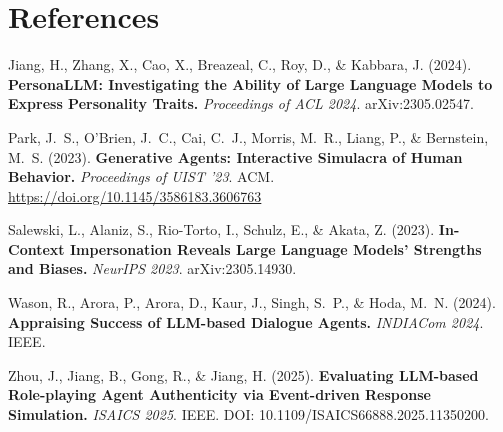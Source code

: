\documentclass[12pt,a4paper]{article}
\begin{document}
\section{References}

\begin{description}[leftmargin=0em,itemsep=0.5em]
  \item Jiang, H., Zhang, X., Cao, X., Breazeal, C., Roy, D., \& Kabbara, J. (2024).
        \textbf{PersonaLLM: Investigating the Ability of Large Language Models to Express
        Personality Traits.} \textit{Proceedings of ACL 2024}. arXiv:2305.02547.
  \item Park, J.\ S., O'Brien, J.\ C., Cai, C.\ J., Morris, M.\ R., Liang, P., \&
        Bernstein, M.\ S. (2023). \textbf{Generative Agents: Interactive Simulacra of
        Human Behavior.} \textit{Proceedings of UIST '23}. ACM.
        \url{https://doi.org/10.1145/3586183.3606763}
  \item Salewski, L., Alaniz, S., Rio-Torto, I., Schulz, E., \& Akata, Z. (2023).
        \textbf{In-Context Impersonation Reveals Large Language Models' Strengths and
        Biases.} \textit{NeurIPS 2023}. arXiv:2305.14930.
  \item Wason, R., Arora, P., Arora, D., Kaur, J., Singh, S.\ P., \& Hoda, M.\ N. (2024).
        \textbf{Appraising Success of LLM-based Dialogue Agents.} \textit{INDIACom 2024}.
        IEEE.
  \item Zhou, J., Jiang, B., Gong, R., \& Jiang, H. (2025). \textbf{Evaluating
        LLM-based Role-playing Agent Authenticity via Event-driven Response Simulation.}
        \textit{ISAICS 2025}. IEEE. DOI: 10.1109/ISAICS66888.2025.11350200.
\end{description}
\end{document}
